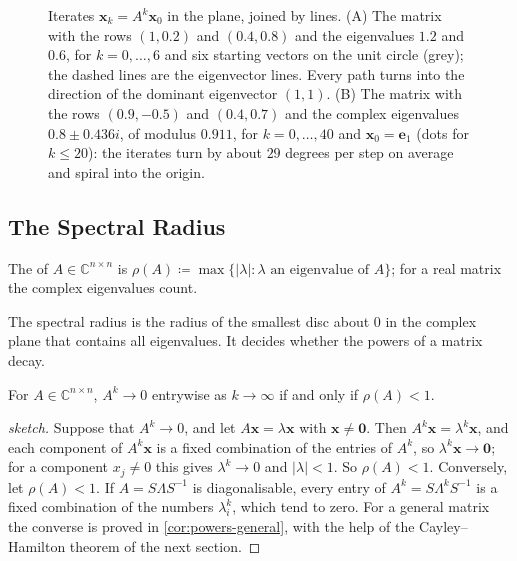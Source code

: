 \begin{figure}
{}
\caption{Iterates $\mathbf x_k=A^k\mathbf x_0$ in the plane, joined by lines. (A) The matrix with the rows $(1,0.2)$ and $(0.4,0.8)$ and the eigenvalues $1.2$ and $0.6$, for $k=0,\ldots,6$ and six starting vectors on the unit circle (grey); the dashed lines are the eigenvector lines. Every path turns into the direction of the dominant eigenvector $(1,1)$. (B) The matrix with the rows $(0.9,-0.5)$ and $(0.4,0.7)$ and the complex eigenvalues $0.8\pm0.436i$, of modulus $0.911$, for $k=0,\ldots,40$ and $\mathbf x_0=\mathbf e_1$ (dots for $k\le20$): the iterates turn by about $29$ degrees per step on average and spiral into the origin.\label{fig:powers-plane}}
\end{figure}

\subsection{The Spectral Radius}

\begin{definition}
\label{def:spectral-radius}
The  of $A\in\mathbb C^{n\times n}$ is $\rho(A)\coloneqq\max\{|\lambda|: \lambda\text{ an eigenvalue of }A\}$; for a real matrix the complex eigenvalues count.
\end{definition}

The spectral radius is the radius of the smallest disc about $0$ in the complex plane that contains all eigenvalues. It decides whether the powers of a matrix decay.

\begin{theorem}
\label{thm:powers-to-zero}
For $A\in\mathbb C^{n\times n}$, $A^k\to0$ entrywise as $k\to\infty$ if and only if $\rho(A)<1$.
\end{theorem}

\begin{proof}[sketch]
Suppose that $A^k\to0$, and let $A\mathbf x=\lambda\mathbf x$ with $\mathbf x\ne\mathbf 0$. Then $A^k\mathbf x=\lambda^k\mathbf x$, and each component of $A^k\mathbf x$ is a fixed combination of the entries of $A^k$, so $\lambda^k\mathbf x\to\mathbf 0$; for a component $x_j\ne0$ this gives $\lambda^k\to0$ and $|\lambda|<1$. So $\rho(A)<1$. Conversely, let $\rho(A)<1$. If $A=S\Lambda S^{-1}$ is diagonalisable, every entry of $A^k=S\Lambda^kS^{-1}$ is a fixed combination of the numbers $\lambda_i^k$, which tend to zero. For a general matrix the converse is proved in \cref{cor:powers-general}, with the help of the Cayley--Hamilton theorem of the next section.
\end{proof}

